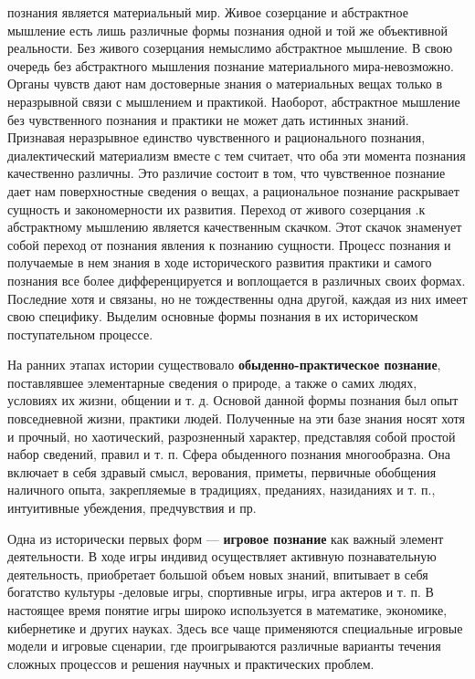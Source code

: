 \documentclass[12pt]{article}
\begin{document}
познания является материальный мир. Живое созерцание и абстрактное мышление есть лишь различные формы
познания одной и той же объективной реальности.
Без  живого  созерцания  немыслимо  абстрактное  мышление.  В  свою  очередь  без  абстрактного  мышления
познание  материального  мира-невозможно.  Органы  чувств  дают  нам  достоверные  знания  о  материальных
вещах  только  в  неразрывной  связи  с  мышлением  и  практикой.  Наоборот,  абстрактное  мышление  без
чувственного познания и практики не может дать истинных знаний.
Признавая неразрывное единство чувственного и рационального познания, диалектический материализм вместе
с  тем  считает,  что  оба  эти  момента  познания  качественно  различны.  Это  различие  состоит  в  том,  что
чувственное  познание  дает  нам  поверхностные  сведения  о  вещах,  а  рациональное  познание  раскрывает
сущность и закономерности их развития. Переход от живого созерцания .к абстрактному мышлению является
качественным скачком. Этот скачок знаменует собой переход от познания явления к познанию сущности.
Процесс познания и получаемые в нем знания в ходе исторического развития практики и самого познания все
более  дифференцируется  и  воплощается  в  различных  своих  формах.  Последние  хотя  и  связаны,  но  не
тождественны одна другой, каждая из них имеет свою специфику. Выделим основные формы познания в их
историческом поступательном процессе.

На  ранних  этапах  истории  существовало  \textbf{обыденно-практическое  познание},  поставлявшее  элементарные
сведения о природе, а также о самих людях, условиях их жизни, общении и т. д. Основой данной формы
познания  был  опыт  повседневной  жизни,  практики  людей.  Полученные  на  эти  базе  знания  носят  хотя  и
прочный, но хаотический, разрозненный характер, представляя собой простой набор сведений, правил и т. п.
Сфера  обыденного  познания  многообразна.  Она  включает  в  себя  здравый  смысл,  верования,  приметы,
первичные  обобщения  наличного  опыта,  закрепляемые  в  традициях,  преданиях,  назиданиях  и  т.  п.,
интуитивные убеждения, предчувствия и пр.

Одна из исторически первых форм --- \textbf{игровое познание} как важный элемент деятельности. В ходе игры индивид
осуществляет активную познавательную деятельность, приобретает большой объем новых знаний, впитывает в
себя богатство культуры -деловые игры, спортивные игры, игра актеров и т. п.
В настоящее время понятие игры широко используется в математике, экономике, кибернетике и других науках.
Здесь все чаще применяются специальные игровые модели и игровые сценарии, где проигрываются различные
варианты течения сложных процессов и решения научных и практических проблем.
\end{document}
